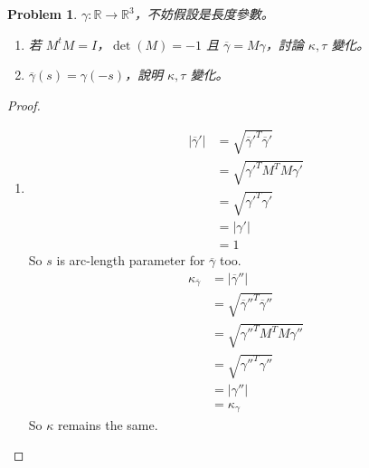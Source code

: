 \documentclass[10pt,a4paper]{article}
\newcounter{theProblemCounter}
\newtheorem{problem}[theProblemCounter]{Problem}
\begin{document}
\setcounter{theProblemCounter}{6}
\begin{problem}
$\gamma:\mathbb{R}\to\mathbb{R}^3$，不妨假設是長度參數。
\begin{enumerate}
\item[(b)] 若 $M^tM=I$，$\det(M)=-1$ 且 $\overline{\gamma}=M\gamma$，討論 $\kappa, \tau$ 變化。
\item[(c)] $\overline{\gamma}(s)=\gamma(-s)$，說明 $\kappa, \tau$ 變化。
\end{enumerate}
\end{problem}
\begin{proof}
\begin{enumerate}
\item[(b)]
\begin{align*}
\left|\overline{\gamma}'\right|&=\sqrt{\overline{\gamma}'^T\overline{\gamma}'}\\
&=\sqrt{\gamma'^TM^TM\gamma'}\\
&=\sqrt{\gamma'^T\gamma'}\\
&=\left|\gamma'\right|\\
&=1
\end{align*}
So $s$ is arc-length parameter for $\overline{\gamma}$ too.\\
\begin{align*}
\kappa_{\overline{\gamma}}&=\left|\overline{\gamma}''\right|\\
&=\sqrt{\overline{\gamma}''^T\overline{\gamma}''}\\
&=\sqrt{\gamma''^TM^TM\gamma''}\\
&=\sqrt{\gamma''^T\gamma''}\\
&=\left|\gamma''\right|\\
&=\kappa_{\gamma}
\end{align*}
So $\kappa$ remains the same.



\end{enumerate}
\end{proof}
\end{document}
